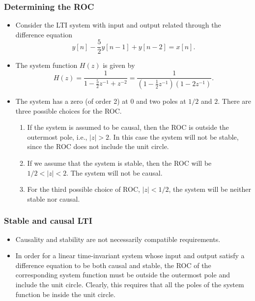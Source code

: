 \begin{frame}
\frametitle{Determining the ROC}
\begin{itemize}
\item Consider the LTI system with input and output related through the difference equation
$$
y[n]-\frac{5}{2}y[n-1]+y[n-2]=x[n].
$$
\item The system function $H(z)$ is given by
$$
H(z)=\frac{1}{1-\frac{5}{2}z^{-1}+z^{-2}}=\frac{1}{(1-\frac{1}{2}z^{-1})(1-2z^{-1})}.
$$
\item The system has a zero (of order 2) at $0$ and two poles at $1/2$ and $2$. There are three possible choices for the ROC.
\begin{enumerate}
\item  If the system is assumed to be causal, then the ROC is outside the outermost pole, i.e., $|z|>2$. In this case the system will not be stable, since the ROC does not include the unit circle.
\item If we assume that the system is stable, then the ROC will be $1/2<|z| <2$. The system will not be causal. 
\item For the third possible choice of ROC, $|z|< 1/2$, the system will be neither stable nor causal.
\end{enumerate}
\end{itemize}
\end{frame}

\begin{frame}
\frametitle{Stable and causal LTI}
\begin{itemize}
\item Causality and stability are not necessarily compatible requirements. 
\item In order for a linear time-invariant system whose input and output satisfy a difference equation to be both causal and stable, the ROC of the corresponding system function \alert{must be outside the outermost pole}  and \alert{include the unit circle}. Clearly, this requires that all the poles of the system function be inside the unit circle.
\end{itemize}
\end{frame}

